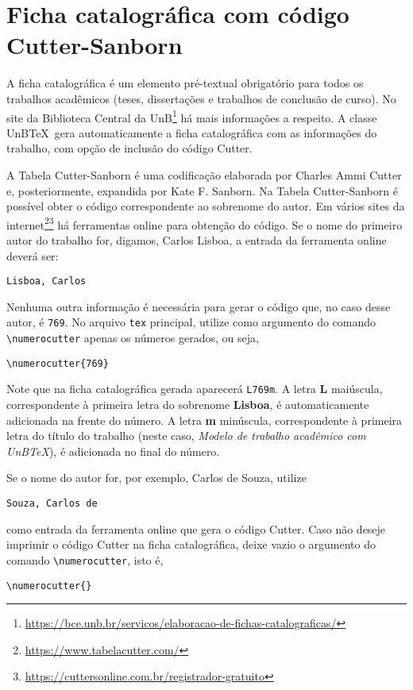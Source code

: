 \section{Ficha catalográfica com código Cutter-Sanborn}

A ficha catalográfica é um elemento pré-textual obrigatório para todos os trabalhos acadêmicos (teses, dissertações e trabalhos de conclusão de curso). No site da Biblioteca Central da UnB\footnote{\url{https://bce.unb.br/servicos/elaboracao-de-fichas-catalograficas/}} há mais informações a respeito. A classe UnB\TeX\ gera automaticamente a ficha catalográfica com as informações do trabalho, com opção de inclusão do código Cutter.

A Tabela Cutter-Sanborn é uma codificação elaborada por Charles Ammi Cutter e, posteriormente, expandida por Kate F. Sanborn. Na Tabela Cutter-Sanborn é possível obter o código correspondente ao sobrenome do autor. Em vários sites da internet\footnote{\url{https://www.tabelacutter.com/}}\footnote{\url{https://cuttersonline.com.br/registrador-gratuito}} há ferramentas online para obtenção do código. Se o nome do primeiro autor do trabalho for, digamos, Carlos Lisboa, a entrada da ferramenta online deverá ser: 
\begin{verbatim}
Lisboa, Carlos
\end{verbatim}
Nenhuma outra informação é necessária para gerar o código que, no caso desse autor, é \texttt{769}. No arquivo \texttt{tex} principal, utilize como argumento do comando \verb|\numerocutter| apenas os números gerados, ou seja,
\begin{verbatim}
\numerocutter{769}
\end{verbatim}
Note que na ficha catalográfica gerada aparecerá \texttt{L769m}. A letra \textbf{L} maiúscula, correspondente à primeira letra do sobrenome \textbf{Lisboa}, é automaticamente adicionada na frente do número. A letra \textbf{m} minúscula, correspondente à primeira letra do título do trabalho (neste caso, \emph{Modelo de trabalho acadêmico com UnB\TeX}), é adicionada no final do número.

Se o nome do autor for, por exemplo, Carlos de Souza, utilize 
\begin{verbatim}
Souza, Carlos de
\end{verbatim}
como entrada da ferramenta online que gera o código Cutter. Caso não deseje imprimir o código Cutter na ficha catalográfica, deixe vazio o argumento do comando \verb|\numerocutter|, isto é,
\begin{verbatim}
\numerocutter{}
\end{verbatim}

